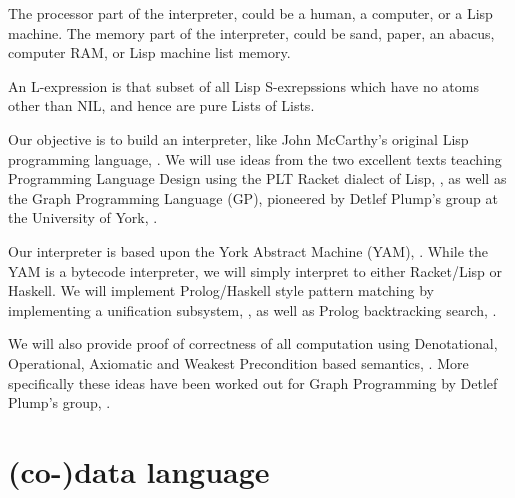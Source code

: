 The processor part of the interpreter, could be a human, a computer, or a Lisp
machine. The memory part of the interpreter, could be sand, paper, an abacus,
computer RAM, or Lisp machine list memory.

An L-expression is that subset of all Lisp S-exrepssions which have no atoms
other than NIL, and hence are pure Lists of Lists.

Our objective is to build an interpreter, like John McCarthy's original Lisp
programming language, \cite{mcCarthy1960lisp,
mcCarthyAbrahamsEdwardsHartLevin1965lispManual}. We will use ideas from the two
excellent texts teaching Programming Language Design using the PLT Racket
dialect of Lisp,
\cite{krishnamurthi2007programmingLanguagesApplicationInterpretation,
krishnamurthi2012programmingLanguagesApplicationInterpretation,
friedmanWand2008essentialsProgrammingLanguages, racket2016racket}, as well as
the Graph Programming Language (GP), pioneered by Detlef Plump's group at the
University of York, \cite{steinert2007graphProgramming,
manningPlump2008yorkMachine, plump2009graphProgramming,
plumpSteinert2010semanticsGraphProgramming, plump2012graphProgramming}.

Our interpreter is based upon the York Abstract Machine (YAM),
\cite{manningPlump2008yorkMachine}. While the YAM is a bytecode interpreter, we
will simply interpret to either Racket/Lisp or Haskell. We will implement
Prolog/Haskell style pattern matching by implementing a unification subsystem,
\cite[section
30.5.1]{krishnamurthi2007programmingLanguagesApplicationInterpretation}, as well
as Prolog backtracking search,
\cite[34.1.1]{krishnamurthi2007programmingLanguagesApplicationInterpretation}.

We will also provide proof of correctness of all computation using Denotational,
Operational, Axiomatic and Weakest Precondition based semantics,
\cite{gunter1992semainticProgrammingLanguages,
winskel1993formalSemanticsProgrammingLanguages, gries1981scienceProgramming,
scott1970theoryComputation, plotkin1981structuralOperationalSemantics,
hoare1969axiomaticSemantics, dijkstra1975guardedCommandsFormalDerivation}. More
specifically these ideas have been worked out for Graph Programming by Detlef
Plump's group, \cite{steinert2007graphProgramming,
plumpSteinert2010semanticsGraphProgramming, poskittPlump2010hoareLogic,
poskittPlump2010hoareCalculus}.

\section{(co-)data language}

